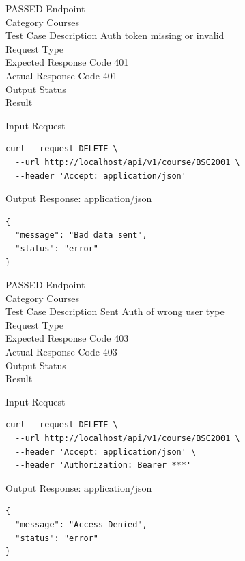 \begin{testcase}{71}{PASSED}
Endpoint \hfill {}\\
Category \hfill Courses\\
Test Case Description \hfill Auth token missing or invalid\\

Request Type    \hfill {}\\
Expected Response Code    \hfill 401\\
Actual Response Code    \hfill 401\\

Output Status \hfill {}\\
Result \hfill {}

\begin{ipblock}{Input Request}
\begin{verbatim}
curl --request DELETE \
  --url http://localhost/api/v1/course/BSC2001 \
  --header 'Accept: application/json' 
\end{verbatim}
\end{ipblock}

\begin{opblock}{Output Response: application/json}
\begin{verbatim}
{
  "message": "Bad data sent",
  "status": "error"
}
\end{verbatim}
\end{opblock}
\end{testcase}

\begin{testcase}{72}{PASSED}
Endpoint \hfill {}\\
Category \hfill Courses\\
Test Case Description \hfill Sent Auth of wrong user type\\

Request Type    \hfill {}\\
Expected Response Code    \hfill 403\\
Actual Response Code    \hfill 403\\

Output Status \hfill {}\\
Result \hfill {}

\begin{ipblock}{Input Request}
\begin{verbatim}
curl --request DELETE \
  --url http://localhost/api/v1/course/BSC2001 \
  --header 'Accept: application/json' \
  --header 'Authorization: Bearer ***'
\end{verbatim}
\end{ipblock}

\begin{opblock}{Output Response: application/json}
\begin{verbatim}
{
  "message": "Access Denied",
  "status": "error"
}
\end{verbatim}
\end{opblock}
\end{testcase}

